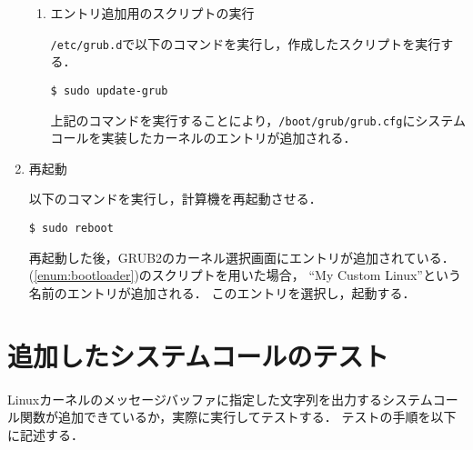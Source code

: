 \documentclass[12pt]{jsarticle}
\begin{document}
\begin{enumerate}
\begin{enumerate}
\item エントリ追加用のスクリプトの実行

  \verb|/etc/grub.d|で以下のコマンドを実行し，作成したスクリプトを実行する．
\begin{verbatim}
$ sudo update-grub
\end{verbatim}
  上記のコマンドを実行することにより，\verb|/boot/grub/grub.cfg|にシステムコールを実装したカーネルのエントリが追加される．

\end{enumerate}

\item 再起動

  以下のコマンドを実行し，計算機を再起動させる．
\begin{verbatim}
$ sudo reboot
\end{verbatim}
再起動した後，GRUB2のカーネル選択画面にエントリが追加されている．
(\ref{enum:bootloader})のスクリプトを用いた場合， ``My Custom Linux''という名前のエントリが追加される．
このエントリを選択し，起動する．

\end{enumerate}

\section{追加したシステムコールのテスト}\label{sec:test}
Linuxカーネルのメッセージバッファに指定した文字列を出力するシステムコール関数が追加できているか，実際に実行してテストする．
テストの手順を以下に記述する．
\end{document}
